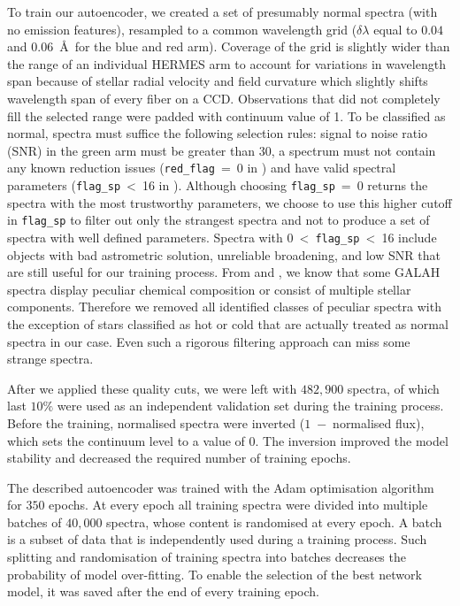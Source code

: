 To train our autoencoder, we created a set of presumably normal spectra (with no emission features), resampled to a common wavelength grid ($\delta \lambda$ equal to $0.04$ and $0.06$~\AA\ for the blue and red arm). Coverage of the grid is slightly wider than the range of an individual HERMES arm to account for variations in wavelength span because of stellar radial velocity and field curvature which slightly shifts wavelength span of every fiber on a CCD. Observations that did not completely fill the selected range were padded with continuum value of 1. To be classified as normal, spectra must suffice the following selection rules: signal to noise ratio (SNR) in the green arm must be greater than $30$, a spectrum must not contain any known reduction issues (\texttt{red\_flag}~=~0 in \citet{2017MNRAS.464.1259K}) and have valid spectral parameters (\texttt{flag\_sp}~<~16 in \citet{buder2020}). Although choosing \texttt{flag\_sp}~=~0 returns the spectra with the most trustworthy parameters, we choose to use this higher cutoff in \texttt{flag\_sp} to filter out only the strangest spectra and not to produce a set of spectra with well defined parameters. Spectra with 0~<~\texttt{flag\_sp}~<~16 include objects with bad astrometric solution, unreliable broadening, and low SNR that are still useful for our training process. From \citet{2017ApJS..228...24T, buder2018} and \citet{2019MNRAS.483.3196C}, we know that some GALAH spectra display peculiar chemical composition or consist of multiple stellar components. Therefore we removed all identified classes of peculiar spectra with the exception of stars classified as hot or cold that are actually treated as normal spectra in our case. Even such a rigorous filtering approach can miss some strange spectra.

After we applied these quality cuts, we were left with $482,900$ spectra, of which last $10\%$ were used as an independent validation set during the training process. Before the training, normalised spectra were inverted ($1$~$-$~normalised flux), which sets the continuum level to a value of $0$. The inversion improved the model stability and decreased the required number of training epochs.

The described autoencoder was trained with the Adam optimisation algorithm \cite{2014arXiv1412.6980K} for $350$ epochs. At every epoch all training spectra were divided into multiple batches of $40,000$ spectra, whose content is randomised at every epoch. A batch is a subset of data that is independently used during a training process. Such splitting and randomisation of training spectra into batches decreases the probability of model over-fitting. To enable the selection of the best network model, it was saved after the end of every training epoch. 

